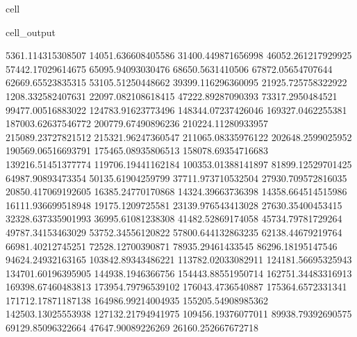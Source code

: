 \documentclass[letterpaper,10pt,english]{jupyterBook}
\begin{document}
\begin{sphinxuseclass}{cell}
\begin{sphinxVerbatimOutput}
\begin{sphinxuseclass}{cell_output}
\begin{sphinxVerbatim}[commandchars=\\\{\}]
5361.114315308507  \PYGZhy{}14051.636608405586  \PYGZhy{}31400.449871656998  \PYGZhy{}46052.261217929925  \PYGZhy{}57442.17029614675  \PYGZhy{}65095.94093030476  \PYGZhy{}68650.5631410506  \PYGZhy{}67872.05654707644  \PYGZhy{}62669.65523835315  \PYGZhy{}53105.51250448662  \PYGZhy{}39399.116296360095  \PYGZhy{}21925.725758322922  \PYGZhy{}1208.332582407631  22097.082108618415  47222.89287090393  73317.2950484521  99477.00516883022  124783.91623773496  148344.07237426046  169327.0462255381  187003.62637546772  200779.67490896236  210224.11280933957  215089.23727821512  215321.96247360547  211065.08335976122  202648.2599025952  190569.06516693791  175465.08935806513  158078.69354716683  139216.51451377774  119706.19441162184  100353.01388141897  81899.12529701425  64987.90893473354  50135.61904259799  37711.973710532504  27930.709572816035  20850.417069192605  16385.24770170868  14324.39663736398  14358.664514515986  16111.936699518948  19175.1209725581  23139.976543413028  27630.35400453415  32328.637335901993  36995.61081238308  41482.52869174058  45734.79781729264  49787.34153463029  53752.34556120822  57800.644132863235  62138.44679219764  66981.40212745251  72528.12700390871  78935.29461433545  86296.18195147546  94624.24932163165  103842.89343486221  113782.02033082911  124181.56695325943  134701.60196395905  144938.1946366756  154443.88551950714  162751.34483316913  169398.67460483813  173954.79796539102  176043.4736540887  175364.6572331341  171712.17871187138  164986.99214004935  155205.54908985362  142503.13025553938  127132.21794941975  109456.19376077011  89938.79392690575  69129.85096322664  47647.90089226269  26160.252667672718  

\end{sphinxVerbatim}
\end{sphinxuseclass}
\end{sphinxVerbatimOutput}
\end{sphinxuseclass}
\end{document}
